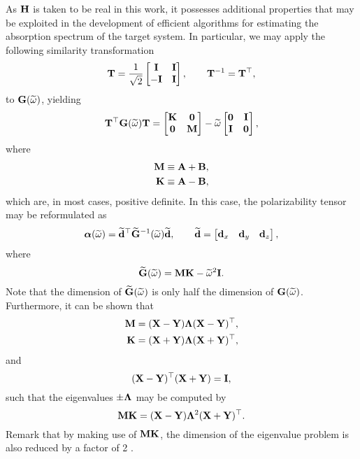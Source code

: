 As $\mathbf{H}$ is taken to be real in this work, it possesses additional properties that may be exploited in the development of efficient algorithms for estimating the absorption spectrum of the target system. In particular, we may apply the following similarity transformation
\begin{equation}
  \bT = \frac{1}{\sqrt{2}} \begin{bmatrix*}
     \bI & \bI \\
    -\bI & \bI
  \end{bmatrix*}, \qquad \bT\inv = \bT\T,
\label{eq:defT}
\end{equation}
to $\mathbf{G}(\widetilde{\omega})$, yielding
\begin{equation}
  \mathbf{T}^\top \mathbf{G}(\widetilde{\omega}) \mathbf{T} = \begin{bmatrix}
    \mathbf{K} & \boldsymbol{0} \\
    \boldsymbol{0} & \mathbf{M}
  \end{bmatrix} - \widetilde{\omega} \begin{bmatrix}
    \boldsymbol{0} & \mathbf{I} \\
    \mathbf{I} & \boldsymbol{0}
  \end{bmatrix},
  \label{eq:}
\end{equation}
where
\begin{align}
  \mathbf{M} &\equiv \mathbf{A} + \mathbf{B}, \label{eq:defM} \\
  \mathbf{K} &\equiv \mathbf{A} - \mathbf{B}, \label{eq:defK}
\end{align}
which are, in most cases, positive definite. In this case, the polarizability tensor may be reformulated as
\begin{equation}
  \boldsymbol{\alpha}(\widetilde{\omega}) = \widetilde{\mathbf{d}}^\top \widetilde{\mathbf{G}}^{-1}(\widetilde{\omega}) \widetilde{\mathbf{d}}, \qquad \widetilde{\mathbf{d}} = \begin{bmatrix}
    \mathbf{d}_x & \mathbf{d}_y & \mathbf{d}_z
  \end{bmatrix},
  \label{eq:polar-tensor-MK}
\end{equation}
where
\begin{equation}
  \widetilde{\mathbf{G}}(\widetilde{\omega}) = \mathbf{M}\mathbf{K} - \widetilde{\omega}^2\mathbf{I}.
  \label{eq:defGt}
\end{equation}
Note that the dimension of $\widetilde{\mathbf{G}}(\widetilde{\omega})$ is only half the dimension of $\mathbf{G}(\widetilde{\omega})$. Furthermore, it can be shown that
\begin{align}
 \mathbf{M} &= (\mathbf{X} - \mathbf{Y}) \mathbf{\Lambda} (\mathbf{X} - \mathbf{Y})^\top, \\
 \mathbf{K} &= (\mathbf{X} + \mathbf{Y}) \mathbf{\Lambda} (\mathbf{X} + \mathbf{Y})^\top,
\end{align}
and
\begin{equation}
  (\mathbf{X} - \mathbf{Y})^\top (\mathbf{X} + \mathbf{Y}) = \mathbf{I},
\end{equation}
such that the eigenvalues $\pm\mathbf{\Lambda}$ may be computed by
\begin{equation}
  \mathbf{M}\mathbf{K} = (\mathbf{X} - \mathbf{Y}) \mathbf{\Lambda}^2 (\mathbf{X} + \mathbf{Y})^\top.
\end{equation}
Remark that by making use of $\mathbf{M}\mathbf{K}$, the dimension of the eigenvalue problem is also reduced by a factor of 2 \cite{Haser93_1262,Frisch98_8218}.


